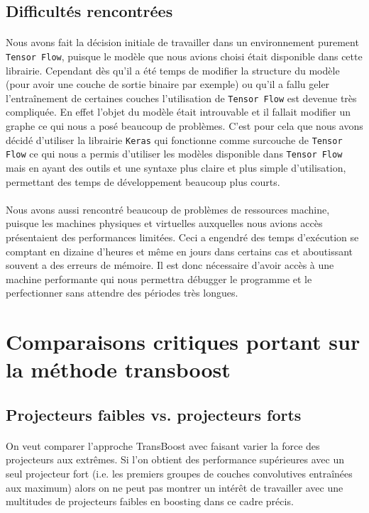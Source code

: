 \documentclass[11 pt]{article}
\begin{document}
\subsection{Difficultés rencontrées}
\paragraph{}Nous avons fait la décision initiale de travailler dans un environnement purement \texttt{Tensor Flow}, puisque le modèle que nous avions choisi était disponible dans cette librairie. Cependant dès qu’il a été temps de modifier la structure du modèle (pour avoir une couche de sortie binaire par exemple) ou qu’il a fallu geler l'entraînement de certaines couches l’utilisation de \texttt{Tensor Flow} est devenue très compliquée. En effet l’objet du modèle était introuvable et il fallait modifier un graphe ce qui nous a posé beaucoup de problèmes. C’est pour cela que nous avons décidé d’utiliser la librairie \texttt{Keras} qui fonctionne comme surcouche de \texttt{Tensor Flow} ce qui nous a permis d’utiliser les modèles disponible dans \texttt{Tensor Flow} mais en ayant des outils et une syntaxe plus claire et plus simple d’utilisation, permettant des temps de développement beaucoup plus courts.

\paragraph{}Nous avons aussi rencontré beaucoup de problèmes de ressources machine, puisque les machines physiques et virtuelles auxquelles nous avions accès présentaient des performances limitées. Ceci a engendré des temps d'exécution se comptant en dizaine d’heures et même en jours dans certains cas et aboutissant souvent a des erreurs de mémoire. Il est donc nécessaire d’avoir accès à une machine performante qui nous permettra débugger le programme et le perfectionner sans attendre des périodes très longues.

\section{Comparaisons critiques portant sur la méthode transboost}
\subsection{Projecteurs faibles vs. projecteurs forts}
\paragraph{}On veut comparer l’approche TransBoost avec faisant varier la force des projecteurs aux extrêmes. Si l’on obtient des performance supérieures avec un seul projecteur fort (i.e. les premiers groupes de couches convolutives entraînées aux maximum) alors on ne peut pas montrer un intérêt de travailler avec une multitudes de projecteurs faibles en boosting dans ce cadre précis.
\end{document}
